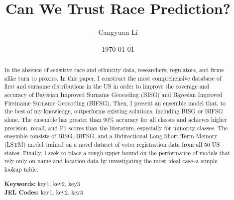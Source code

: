 \documentclass[12pt]{article}
\begin{document}
\begin{titlepage}
\title{Can We Trust Race Prediction?}
\author{Cangyuan Li}
\date{\today}
\maketitle
\begin{abstract}
    \noindent 

    In the absence of sensitive race and ethnicity data, researchers, regulators, and firms alike turn to proxies. In this paper, 
    I construct the most comprehensive database of first and surname distributions in the US in order to improve the coverage and accuracy of Bayesian Improved Surname Geocoding (BISG) and Bayesian Improved Firstname Surname Geocoding (BIFSG). Then, I present an ensemble model that, to the best of my knowledge, outperforms existing solutions, including BISG or BIFSG alone. The ensemble has greater than 90\% accuracy for all classes and achieves higher precision, recall, and F1 scores than the literature, especially for minority classes. The ensemble consists of BISG, BIFSG, and a Bidirectional Long Short-Term Memory (LSTM) model trained on a novel dataset of voter registration data from all 50 US states. Finally, I seek to place a rough upper bound on the performance of models that rely only on name and location data by investigating the most ideal case--a simple lookup table.


    

    \vspace{0in}
    \noindent\textbf{Keywords:} key1, key2, key3 \\
    \vspace{0in}
    \noindent\textbf{JEL Codes:} key1, key2, key3 \\

    \bigskip
\end{abstract}
\setcounter{page}{0}
\thispagestyle{empty}
\end{titlepage}
\pagebreak \newpage
\end{document}
